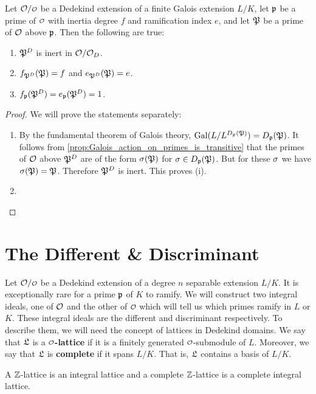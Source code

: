     \begin{proposition}
      Let $\mc{O}/\smc{O}$ be a Dedekind extension of a finite Galois extension $L/K$, let $\mathfrak{p}$ be a prime of $\smc{O}$ with inertia degree $f$ and ramification index $e$, and let $\mathfrak{P}$ be a prime of $\mathcal{O}$ above $\mathfrak{p}$. Then the following are true:
      \begin{enumerate}
        \item $\mathfrak{P}^{D}$ is inert in $\mathcal{O}/\mathcal{O}_{D}$.
        \item $f_{\mathfrak{P}^{D}}(\mathfrak{P}) = f$ and $e_{\mathfrak{P}^{D}}(\mathfrak{P}) = e$.
        \item $f_{\mathfrak{p}}(\mathfrak{P}^{D}) = e_{\mathfrak{p}}(\mathfrak{P}^{D}) = 1$.
      \end{enumerate}
    \end{proposition}
    \begin{proof}
      We will prove the statements separately:
      \begin{enumerate}
        \item By the fundamental theorem of Galois theory, $\operatorname{\mathrm{Gal}}(L/L^{D_{\mathfrak{p}}(\mathfrak{P})}) = D_{\mathfrak{p}}(\mathfrak{P})$. It follows from \cref{prop:Galois_action_on_primes_is_transitive} that the primes of $\mathcal{O}$ above $\mathfrak{P}^{D}$ are of the form $\sigma(\mathfrak{P})$ for $\sigma \in D_{\mathfrak{p}}(\mathfrak{P})$. But for these $\sigma$ we have $\sigma(\mathfrak{P}) = \mathfrak{P}$. Therefore $\mathfrak{P}^{D}$ is inert. This proves (i).
        \item {}
      \end{enumerate}
    \end{proof}
  \section{The Different \& Discriminant}
    Let $\mc{O}/\smc{O}$ be a Dedekind extension of a degree $n$ separable extension $L/K$. It is exceptionally rare for a prime $\mathfrak{p}$ of $K$ to ramify. We will construct two integral ideals, one of $\mathcal{O}$ and the other of $\smc{O}$ which will tell us which primes ramify in $L$ or $K$. These integral ideals are the different and discriminant respectively. To describe them, we will need the concept of lattices in Dedekind domains. We say that $\mathfrak{L}$ is a \textbf{$\smc{O}$-lattice} if it is a finitely generated $\smc{O}$-submodule of $L$. Moreover, we say that $\mathfrak{L}$ is \textbf{complete} if it spans $L/K$. That is, $\mathfrak{L}$ contains a basis of $L/K$.

    \begin{remark}
      A $\mathbb{Z}$-lattice is an integral lattice and a complete $\mathbb{Z}$-lattice is a complete integral lattice.
    \end{remark}

